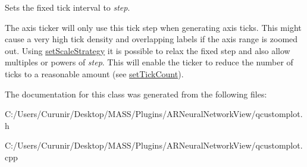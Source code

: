 Sets the fixed tick interval to {\itshape step}.

The axis ticker will only use this tick step when generating axis ticks. This might cause a very high tick density and overlapping labels if the axis range is zoomed out. Using \hyperlink{class_q_c_p_axis_ticker_fixed_acbc7c9bcd80b3dc3edee5f0519d301f6}{set\+Scale\+Strategy} it is possible to relax the fixed step and also allow multiples or powers of {\itshape step}. This will enable the ticker to reduce the number of ticks to a reasonable amount (see \hyperlink{class_q_c_p_axis_ticker_a47752abba8293e6dc18491501ae34008}{set\+Tick\+Count}). 

The documentation for this class was generated from the following files\+:\begin{DoxyCompactItemize}
\item 
C\+:/\+Users/\+Curunir/\+Desktop/\+M\+A\+S\+S/\+Plugins/\+A\+R\+Neural\+Network\+View/qcustomplot.\+h\item 
C\+:/\+Users/\+Curunir/\+Desktop/\+M\+A\+S\+S/\+Plugins/\+A\+R\+Neural\+Network\+View/qcustomplot.\+cpp\end{DoxyCompactItemize}
